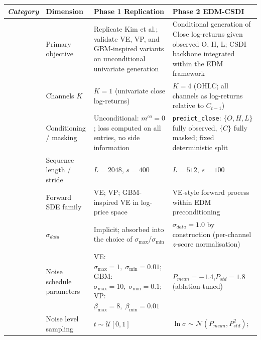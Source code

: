 \begin{table}[htbp]
\label{tab:comparisons}
\centering
\footnotesize
\renewcommand{\arraystretch}{1.35}
\setlength{\tabcolsep}{5pt}
\begin{tabular}{
  >{\itshape}p{2.0cm}
  p{3.3cm}
  p{4.65cm}
  p{4.65cm}
}
\toprule
\normalfont\textbf{Category}
  & \textbf{Dimension}
  & \textbf{Phase 1 \textemdash{} Replication}
  & \textbf{Phase 2 \textemdash{} EDM-CSDI} \\
\midrule
\multirow{4}{2.0cm}{Problem setup}
  & Primary objective
  & Replicate Kim et al.\cite{kim2025diffusion}; validate VE, VP, and GBM-inspired
    variants on unconditional univariate generation
  & Conditional generation of Close log-returns given observed O, H, L;
    CSDI backbone integrated within the EDM framework \\[3pt]
  & Channels $K$
  & $K=1$ (univariate close log-returns)
  & $K=4$ (OHLC; all channels as log-returns relative to $C_{t-1}$) \\[3pt]
  & Conditioning / masking
  & Unconditional: $m^{co}=0$; loss computed on all
    entries, no side information
  & \texttt{predict\_close}: $\{O,H,L\}$ fully observed, $\{C\}$ fully
    masked; fixed deterministic split \\[3pt]
  & Sequence length / stride
  & $L=2048$,\; $s=400$
  & $L=512$,\; $s=100$ \\
\midrule
\multirow{4}{2.0cm}{Diffusion process}
  & Forward SDE family
  & VE; VP;
    GBM-inspired VE in log-price space
  & VE-style forward process within EDM preconditioning\\[3pt]
  & $\sigma_{data}$
  & Implicit; absorbed into the choice of $\sigma_{\max}$/$\sigma_{\min}$
  & $\sigma_{data}=1.0$ by construction
    (per-channel $z$-score normalisation) \\[3pt]
  & Noise schedule parameters
  & VE: $\sigma_{\max}{=}1,\;\sigma_{\min}{=}0.01$;\;
    GBM: $\sigma_{\max}{=}10,\;\sigma_{\min}{=}0.1$;\;
    VP: $\beta_{\max}{=}8,\;\beta_{\min}{=}0.01$
  & $P_{mean}{=}{-1.4}$,\;$P_{std}{=}1.8$
    (ablation-tuned) \\[3pt]
  & Noise level sampling
  & $t\sim\mathcal{U}[0,1]$
  & $\ln\sigma\sim\mathcal{N}(P_{mean},P_{std}^{2})$;\\
\midrule

\end{tabular}
\end{table}
